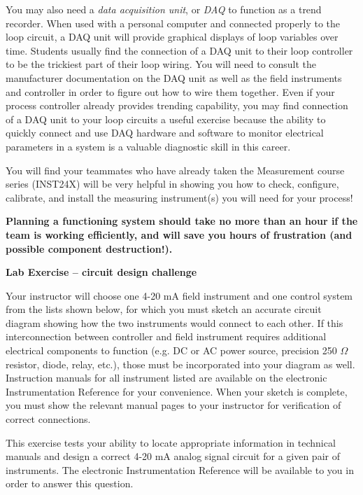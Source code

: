 You may also need a {\it data acquisition unit}, or {\it DAQ} to function as a trend recorder.  When used with a personal computer and connected properly to the loop circuit, a DAQ unit will provide graphical displays of loop variables over time.  Students usually find the connection of a DAQ unit to their loop controller to be the trickiest part of their loop wiring.  You will need to consult the manufacturer documentation on the DAQ unit as well as the field instruments and controller in order to figure out how to wire them together.  Even if your process controller already provides trending capability, you may find connection of a DAQ unit to your loop circuits a useful exercise because the ability to quickly connect and use DAQ hardware and software to monitor electrical parameters in a system is a valuable diagnostic skill in this career.

You will find your teammates who have already taken the Measurement course series (INST24X) will be very helpful in showing you how to check, configure, calibrate, and install the measuring instrument(s) you will need for your process!

\vskip 10pt

{\bf Planning a functioning system should take no more than an hour if the team is working efficiently, and will save you hours of frustration (and possible component destruction!).}






\vfil \eject

\noindent
{\bf Lab Exercise -- circuit design challenge}

\vskip 5pt

Your instructor will choose one 4-20 mA field instrument and one control system from the lists shown below, for which you must sketch an accurate circuit diagram showing how the two instruments would connect to each other.  If this interconnection between controller and field instrument requires additional electrical components to function (e.g. DC or AC power source, precision 250 $\Omega$ resistor, diode, relay, etc.), those must be incorporated into your diagram as well.  Instruction manuals for all instrument listed are available on the electronic Instrumentation Reference for your convenience.  When your sketch is complete, you must show the relevant manual pages to your instructor for verification of correct connections.

This exercise tests your ability to locate appropriate information in technical manuals and design a correct 4-20 mA analog signal circuit for a given pair of instruments.  The electronic Instrumentation Reference will be available to you in order to answer this question.

